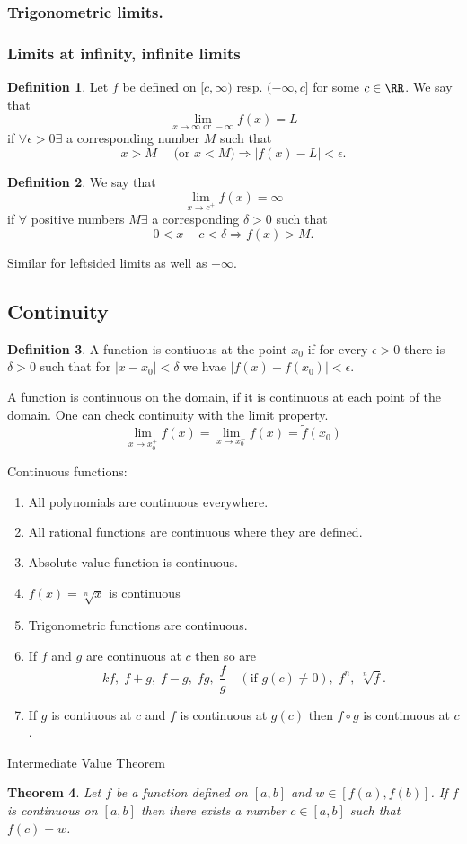 \documentclass{article}
\theoremstyle{plain}
\newtheorem{theo}{Theorem}%
\theoremstyle{remark}
\theoremstyle{definition}
\newtheorem{defi}[theo]{Definition}
\begin{document}
\subsubsection*{Trigonometric limits.}

\subsubsection*{Limits at infinity, infinite limits}

\begin{defi} Let $f$ be defined on $[c,\infty)$ resp. $(-\infty,c]$ for some $c\in\RR$. We say that 
$$\lim_{x\rightarrow\infty\text{ or }-\infty} f(x) = L$$
if $\forall\epsilon>0\exists$ a corresponding number $M$ such that 
$$x>M\quad\text{ (or }x<M) \Rightarrow |f(x)-L|<\epsilon.$$
\end{defi}
\begin{defi} We say that 
$$\lim_{x\rightarrow c^+}f(x)=\infty$$
if $\forall$ positive numbers $M\exists$ a corresponding $\delta>0$ such that
$$0<x-c<\delta\Rightarrow f(x)>M.$$
\end{defi}
Similar for leftsided limits as well as $-\infty$.

\subsection*{Continuity}

\begin{defi} A function is contiuous at the point $x_0$ if for every $\epsilon>0$ there is $\delta>0$ such that for $|x-x_0|<\delta$ we hvae $|f(x)-f(x_0)|<\epsilon$.\end{defi}
A function is continuous on the domain, if it is continuous at each point of the domain. One can check continuity with the limit property.
$$\lim_{x\rightarrow x_0^+}f(x)=\lim_{x\rightarrow x_0^-}f(x)=\widetilde{f}(x_0)$$

Continuous functions:
\begin{enumerate}\item All polynomials are continuous everywhere.
\item All rational functions are continuous where they are defined.
\item Absolute value function is continuous.
\item $f(x)=\sqrt[n]{x}$ is continuous
\item Trigonometric functions are continuous.
\item If $f$ and $g$ are continuous at $c$ then so are
$$kf,\;f+g,\;f-g,\;fg,\;\frac{f}{g}\quad(\text{if }g(c)\neq 0),\;f^n,\;\sqrt[n]{f}.$$
\item If $g$ is contiuous at $c$ and $f$ is continuous at $g(c)$ then $f\circ g$ is continuous at $c$.
\end{enumerate}

Intermediate Value Theorem
\begin{theo} Let $f$ be a function defined on $[a,b]$ and $w\in[f(a),f(b)]$. If $f$ is continuous on $[a,b]$ then there exists a number $c\in[a,b]$ such that $f(c)=w$.\end{theo}
\end{document}
